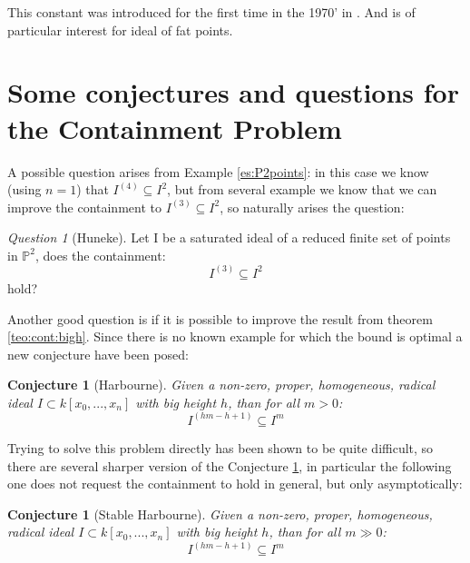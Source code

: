 \documentclass[a4wide]{book}
\theoremstyle{plain}
\newtheorem{conj}[teo]{Conjecture}
\theoremstyle{remark}
\newtheorem{que}[rem]{Question}
\theoremstyle{definition}
\newcommand{\PP}{\mathbb{P}}
\newcommand{\cont}[2]{ I^{(#1)} \subseteq I^{#2}}
\newcounter{que}
\begin{document}
This constant was introduced for the first time in the 1970' in \cite{Wald77}. And is of particular interest for ideal of fat points. 

\section[Conjectures]{Some conjectures and questions for the Containment Problem}
	A possible question arises from Example \ref{es:P2points}: in this case we know (using $ n=1 $) that $ \cont{4}{2}$, but from several example we know that we can improve the containment to $ \cont{3}{2} $, so naturally arises the question:
	\begin{que}[Huneke] \label{que:32}
	Let I be a saturated ideal of a reduced finite set of points in $ \PP^2 $, does the containment:
	\[ \cont{3}{2} \]
	hold?
	\end{que}
	
%	
	
	Another good question is if it is possible to improve the result from theorem \ref{teo:cont:bigh}. Since there is no known example for which the bound is optimal a new conjecture have been posed:
	
	\begin{conj}[Harbourne]\label{conj:harb}
		Given a non-zero, proper, homogeneous, radical ideal $ I \subset k[x_0 , ... , x_n] $ with big height $ h $, than for all $ m > 0 $:
		\[
		\cont{hm - h +1}{m}
		\]
	\end{conj}
	
	Trying to solve this problem directly has been shown to be quite difficult, so there are several  sharper version of the Conjecture \ref{conj:harb}, in particular the following one does not request the containment to hold in general, but only asymptotically:
	
	\begin{conj}[Stable Harbourne]\label{conj:stabharb}
			Given a non-zero, proper, homogeneous, radical ideal $ I \subset k[x_0 , ... , x_n] $ with big height $ h $, than for all $ m \gg 0 $:
			\[
			\cont{hm - h +1}{m}
			\]
	\end{conj} 
	
\end{document}
